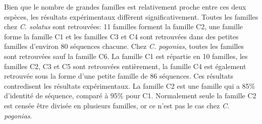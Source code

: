 \documentclass[12pt,a4paper]{article}
\begin{document}
			Bien que le nombre de grandes familles est relativement proche entre ces deux espèces, les résultats expérimentaux diffèrent significativement. Toutes les familles chez \textit{C. solatus} sont retrouvées: 11 familles forment la famille C2, une famille forme la famille C1 et les familles C3 et C4 sont retrouvées dans des petites familles d'environ 80 séquences chacune. Chez \textit{C. pogonias}, toutes les familles sont retrouvées sauf la famille C6. La famille C1 est répartie en 10 familles, les familles C2, C3 et C5 sont retrouvées entièrement, la famille C4 est également retrouvée sous la forme d'une petite famille de 86 séquences. Ces résultats contredisent les résultats expérimentaux. La famille C2 est une famille qui a 85\% d'identité de séquence, comparé à 95\% pour C1. Normalement seule la famille C2 est censée être divisée en plusieurs familles, or ce n'est pas le cas chez \textit{C. pogonias}.
			
\end{document}

